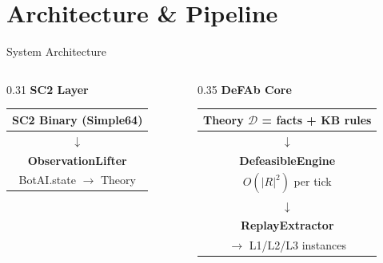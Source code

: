 \documentclass[aspectratio=169, 10pt]{beamer}
\newcommand{\D}{\mathcal{D}}
\begin{document}
\section{Architecture \& Pipeline}

\begin{frame}{System Architecture}

  \begin{columns}[T]
    \begin{column}{0.31\textwidth}
      \centering\textbf{SC2 Layer}\\[0.4em]
      \small
      \begin{tabular}{|c|}
        \hline
        SC2 Binary (Simple64) \\ \hline
        $\downarrow$ \\
        \textbf{ObservationLifter}\\
        BotAI.state $\to$ Theory \\ \hline
      \end{tabular}
    \end{column}

    \begin{column}{0.35\textwidth}
      \centering\textbf{DeFAb Core}\\[0.4em]
      \small
      \begin{tabular}{|c|}
        \hline
        Theory $\D$ = facts + KB rules \\ \hline
        $\downarrow$ \\
        \textbf{DefeasibleEngine}\\
        $O(|R|^2)$ per tick \\ \hline
        $\downarrow$ \\
        \textbf{ReplayExtractor}\\
        $\to$ L1/L2/L3 instances \\ \hline
      \end{tabular}
    \end{column}


\end{columns}
\end{frame}
\end{document}
